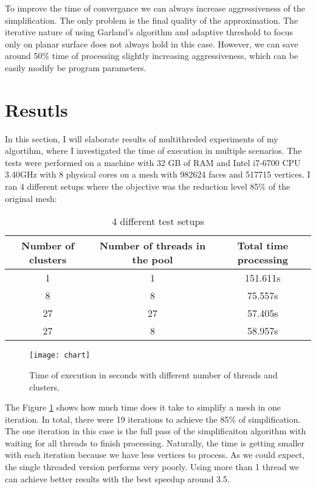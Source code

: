 To improve the time of convergance we can always increase aggressiveness of the simplification. The only problem is the final quality of the approximation. The iterative nature of using Garland's algorithm and adaptive threshold to focus only on planar surface does not always hold in this case. However, we can save around 50\% time of processing slightly increasing aggressiveness, which can be easily modify be program parameters.

\newpage
\section{Resutls}

In this section, I will elaborate results of multithreded experiments of my algortihm, where I investigated the time of execution in multiple scenarios. The tests were performed on a machine with 32 GB of RAM and Intel i7-6700 CPU 3.40GHz with 8 physical cores on a mesh with 982624 faces and 517715 vertices. I ran 4 different setups where the objective was the reduction level 85\% of the original mesh:

\begin{table}[h!]
\centering
\begin{tabular}{ |c|c|c| } 
 \hline
 Number of clusters & Number of threads in the pool & Total time processing\\
 \hline
 1 & 1 & 151.611s\\ 
 8 & 8 & 75.557s\\ 
 27 & 27 & 57.405s\\
 27 & 8 & 58.957s\\
 \hline
\end{tabular}
\caption{4 different test setups}
\end{table}

\begin{figure}[h!]
  \begin{center}
    \texttt{[image: chart]}
    \caption{Time of execution in seconds with different number of threads and clusters.}
    \label{fig:execution_time}
  \end{center}
\end{figure}

The Figure \ref{fig:execution_time} shows how much time does it take to simplify a mesh in one iteration. In total, there were 19 iterations to achieve the 85\% of simplification. The one iteration in this case is the full pass of the simplificaiton algorithm with waiting for all threads to finish processing. Naturally, the time is getting smaller with each iteration because we have less vertices to process. As we could expect, the single threaded version performs very poorly. Using more than 1 thread we can achieve better results with the best speedup around 3.5.

